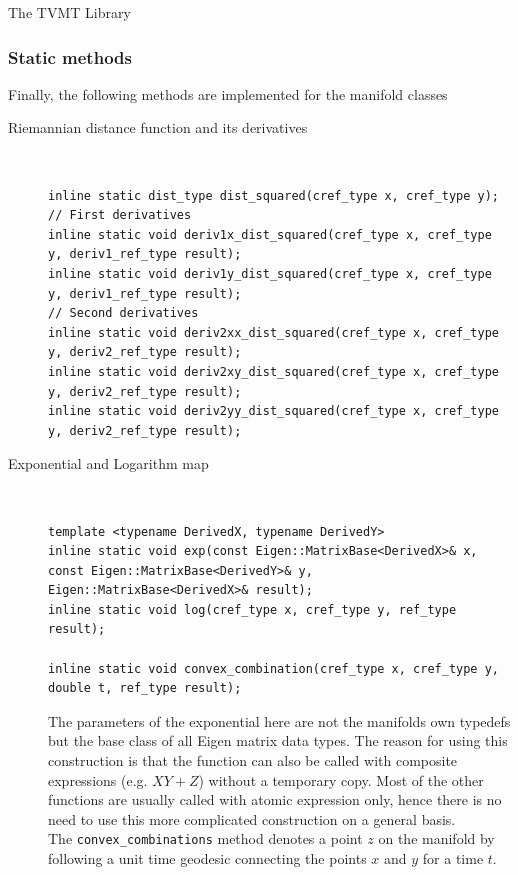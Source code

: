 \begin{chapter}{The TVMT Library}
\subsubsection{Static methods} %
\label{ssub:Static methods}
Finally, the following methods are implemented for the manifold classes

\begin{description}
    
    \item[Riemannian distance function and its derivatives] \hfill \\
	\cppinline
	\begin{lstlisting}
inline static dist_type dist_squared(cref_type x, cref_type y);
// First derivatives	    
inline static void deriv1x_dist_squared(cref_type x, cref_type y, deriv1_ref_type result);
inline static void deriv1y_dist_squared(cref_type x, cref_type y, deriv1_ref_type result);
// Second derivatives
inline static void deriv2xx_dist_squared(cref_type x, cref_type y, deriv2_ref_type result);
inline static void deriv2xy_dist_squared(cref_type x, cref_type y, deriv2_ref_type result);
inline static void deriv2yy_dist_squared(cref_type x, cref_type y, deriv2_ref_type result);
	\end{lstlisting}
    
    \item[Exponential and Logarithm map] \hfill \\
	\cppinline
	\begin{lstlisting}
template <typename DerivedX, typename DerivedY>
inline static void exp(const Eigen::MatrixBase<DerivedX>& x, const Eigen::MatrixBase<DerivedY>& y, Eigen::MatrixBase<DerivedX>& result);
inline static void log(cref_type x, cref_type y, ref_type result);

inline static void convex_combination(cref_type x, cref_type y, double t, ref_type result);
	\end{lstlisting}

	The parameters of the exponential here are not the manifolds own typedefs but the base class of all Eigen matrix data types. The reason for using this construction is that the function
	can also be called with composite expressions (e.g. $XY+Z$) without a temporary copy. Most of the other functions are usually called with atomic expression only, hence there is no
	need to use this more complicated construction on a general basis.\\
	The \texttt{convex\_combinations} method denotes a point $z$ on the manifold by following a unit time geodesic connecting the points $x$ and $y$ for a time $t$.


\end{description}
\end{chapter}
